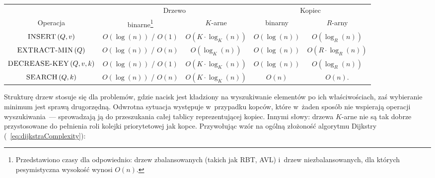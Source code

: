 \begin{center}
	\begin{savenotes}
		\begin{tabular}{ccccc}
			& \multicolumn{2}{c}{Drzewo} & \multicolumn{2}{c}{Kopiec} \\
			\cline{2-5}
			Operacja & binarne\footnote{
				Przedstawiono czasy dla odpowiednio: drzew zbalansowanych (takich jak \textsc{RBT}, \textsc{AVL}) i~drzew niezbalansowanych, dla których pesymistyczna wysokość wynosi $O \left( n\right)$.
			} & $K$-arne & binarny & $R$-arny \\
			\hline
			$\textrm{\textsc{INSERT}} \left( Q, v \right)$ & $ O \left( \log \left( n \right) \right)$ / $ O \left( 1 \right) $ & $O \left( K \cdot \log_{K} \left( n \right) \right)$ & $O \left( \log \left( n \right) \right)$ & $O \left( \log_{R} \left( n \right) \right)$ \\
			$\textrm{\textsc{EXTRACT-MIN}} \left( Q \right)$ & $ O \left( \log \left( n \right) \right)$  / $ O \left( n \right) $ & $ O \left( \log_{K} \left( n\right) \right)$ & $O \left( \log \left( n \right) \right)$ & $O \left( R \cdot \log_{R} \left( n \right) \right)$ \\
			$\textrm{\textsc{DECREASE-KEY}} \left( Q, v, k \right)$ & $ O \left( \log \left( n \right) \right)$  / $ O \left( 1 \right) $ & $O \left( K \cdot \log_{K} \left( n \right) \right)$ & $O \left( \log \left( n \right) \right)$ & $O \left( \log_{R} \left( n \right) \right)$  \\
			$\textrm{\textsc{SEARCH}} \left( Q, k \right)$ & $ O \left( \log \left( n \right) \right)$ / $ O \left( n \right) $ & $O \left( K \cdot \log_{K} \left( n \right) \right)$ & $O \left( n \right)$ & $ O \left( n \right) $.  \\
			\hline
		\end{tabular}
	\end{savenotes}
\end{center}

Strukturę drzew stosuje się dla problemów, gdzie nacisk jest kładziony na wyszukiwanie elementów po ich właściwościach, zaś wybieranie minimum jest sprawą drugorzędną.
Odwrotna sytuacja występuje w~przypadku kopców, które w~żaden sposób nie wspierają operacji wyszukiwania~--- sprowadzają ją do przeszukania całej tablicy reprezentującej kopiec.
Innymi słowy: drzewa $K$-arne nie są tak dobrze przystosowane do pełnienia roli kolejki priorytetowej jak kopce.
Przywołując wzór na ogólną złożoność algorytmu Dijkstry (~\ref{eq:dijkstraComplexity}):

